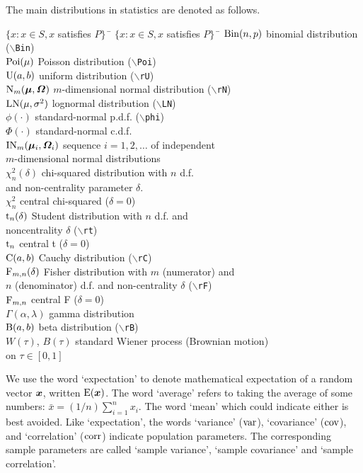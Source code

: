 \documentclass[11pt,dvips,a4paper]{article}
\newcommand{\hspacesymbols}%
   {$\{x: x \in S, x$ satisfies $P\}\;\;$} %
\newcommand{\type}[1]{{\tt$\backslash$#1}}
\begin{document}
The main distributions in statistics are denoted as follows.
\begin{tabbing}
\hspacesymbols \= \hspacesymbols\qquad\quad \=  \kill
$\mathrm{Bin}(n,p)$ \> binomial distribution (\type{Bin}) \\
$\mathrm{Poi}(\mu)$ \> Poisson distribution (\type{Poi}) \\
$\mathrm{U}(a,b)$ \> uniform distribution (\type{rU}) \\
$\mathrm{N}_{m}(\bm \mu,\bm \varOmega)$ \> $m$-dimensional normal distribution (\type{rN})  \\
$\mathrm{LN}(\mu,\sigma^2)$ \> lognormal distribution (\type{LN}) \\
$\phi(\cdot)$ \> standard-normal p.d.f. (\type{phi}) \\
$\Phi(\cdot)$ \> standard-normal c.d.f. \\
$\text{IN}_m(\bm \mu_i,\bm \varOmega_i)$ \> sequence $i=1,2,\dots$ of independent \\
\>$m$-dimensional normal distributions \\
$\chi^2_{n}(\delta)$ \> chi-squared distribution with $n$ d.f.\\
\>and non-centrality parameter $\delta$. \\
$\chi^2_{n}$ \> central chi-squared ($\delta=0$) \\
$\mathrm{t}_n(\delta)$ \> Student distribution with $n$ d.f. and \\
\>noncentrality $\delta$ (\type{rt}) \\
$\mathrm{t}_n$ \> central t ($\delta=0$) \\
$\mathrm{C}(a,b)$ \> Cauchy distribution (\type{rC}) \\
$\mathrm{F}_{m,n}(\delta)$ \> Fisher distribution with $m$ (numerator) and \\
\>$n$ (denominator) d.f. and non-centrality $\delta$ (\type{rF})\\
$\mathrm{F}_{m,n}$ \> central F ($\delta=0$) \\
$\Gamma(\alpha,\lambda)$ \>  gamma distribution \\
$\mathrm{B}(a,b)$ \> beta distribution (\type{rB}) \\
$W(\tau)$, $B(\tau)$ \> standard Wiener process (Brownian motion)\\
\>on $\tau\in [0,1]$
\end{tabbing}
We use the word `expectation' to denote mathematical expectation of a
random vector $\bm x$, written $\operatorname{E}(\bm x)$. The word `average' refers to
taking the average of some numbers:
$\bar{x}=(1/n)\sum_{i=1}^n x_i$. The word `mean' which could indicate
either is best avoided. Like `expectation', the words `variance' ($\operatorname{var}$),
`covariance' ($\operatorname{cov}$), and
`correlation' ($\operatorname{corr}$)
indicate population parameters. The corresponding
sample parameters are called `sample variance', `sample covariance' and
`sample correlation'.
\end{document}

